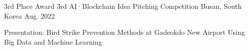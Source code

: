 

\begin{cventries}

  \cventry
  {3rd Place Award} %
  {3rd AI·Blockchain Idea Pitching Competition} %
  {Busan, South Korea} %
  {Aug. 2022} %
  {
    \begin{cvitems} %
      \item {Presentation: Bird Strike Prevention Methods at Gadeokdo New Airport Using Big Data and Machine Learning}
    \end{cvitems}
  }

\end{cventries}

